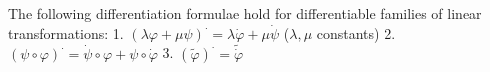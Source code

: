 The following differentiation formulae hold for differentiable families of linear transformations:
1. $(\lambda \varphi + \mu \psi)^{\cdot} = \lambda \dot{\varphi} + \mu \dot{\psi}$ ($\lambda, \mu$ constants)
2. $(\psi \circ \varphi)^{\cdot} = \dot{\psi} \circ \varphi + \psi \circ \dot{\varphi}$
3. $(\tilde{\varphi})^{\cdot} = \widetilde{\dot{\varphi}}$
